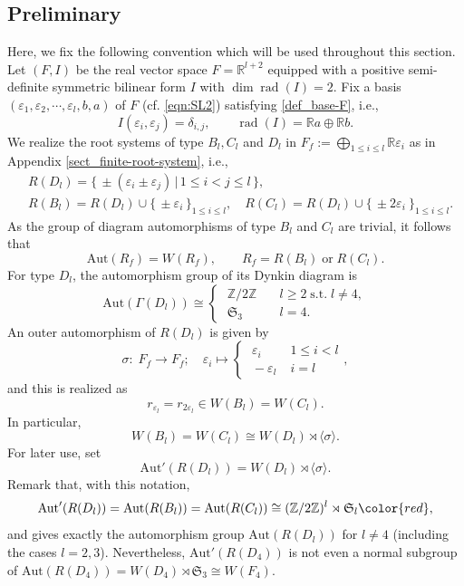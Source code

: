 \documentclass[11pt]{amsart}
\newcommand{\R}{\mathbb{R}}
\newcommand{\Z}{\mathbb{Z}}
\newcommand{\fS}{\mathfrak{S}}
\newcommand{\Aut}{\mathrm{Aut}}
\newcommand{\rad}{\operatorname{rad}}
\newcommand{\vep}{\varepsilon}
\begin{document}
\subsection{Preliminary}
Here, we fix the following convention which will be used throughout this section. \\
Let $(F,I)$ be the real vector space $F=\R^{l+2}$ equipped with a positive semi-definite symmetric bilinear form $I$ with $\dim \rad(I)=2$. Fix a basis $(\vep_1, \vep_2, \cdots, \vep_l, b,a)$ of $F$ (cf. \eqref{eqn:SL2}) satisfying \eqref{def_base-F}, i.e., 
\[ I(\vep_i, \vep_j)=\delta_{i,j}, \qquad \rad(I)=\R a\oplus  \R b. \]
We realize the root systems of type $B_l, C_l$ and $D_l$ in $F_f:=\bigoplus_{1\leq i\leq l} \R \vep_i$ as in Appendix \ref{sect_finite-root-system}, i.e., 
\begin{align*}
& R(D_l)=\{ \, \pm (\vep_i \pm \vep_j)\, \vert\, 1\leq i<j\leq l\, \}, \\
& R(B_l)=R(D_l) \cup \{ \, \pm \vep_i\,\}_{1\leq i\leq l}, \quad R(C_l)=R(D_l) \cup \{\, \pm 2\vep_i\ \}_{1\leq i\leq l}. 
\end{align*}
As the group of diagram automorphisms of type  $B_l$ and $C_l$ are trivial, it follows that
\[ \Aut(R_f)=W(R_f), \qquad R_f=R(B_l)\; \text{or} \; R(C_l). \]
For type $D_l$, the automorphism group of its Dynkin diagram is 
\[ \Aut(\Gamma(D_l)) \cong 
\begin{cases} \; \Z/2\Z \quad & l\geq 2\; \text{s.t.}\; l\neq 4, \\
                     \;\fS_3 \quad &l=4. \end{cases}
\]
An outer automorphism of $R(D_l)$ is given by
\[  \sigma: \; F_f \longrightarrow F_f; \quad \vep_i \mapsto  
                   \begin{cases} \; \vep_i \; & 1\leq i<l  \\ \;  -\vep_l \; & i=l \end{cases}, 
\]
and this is realized as
\[ r_{\vep_l}=r_{2\vep_l} \in W(B_l)=W(C_l). \]
In particular, 
\[ W(B_l)=W(C_l) \cong W(D_l) \rtimes \langle \sigma \rangle. \]
For later use, set
\[ \Aut'(R(D_l))=W(D_l) \rtimes \langle \sigma \rangle. \]
Remark that, with this notation,
\[ \Aut'(R(D_l))=\Aut(R(B_l))=\Aut(R(C_l)) \cong (\Z/2\Z)^l \rtimes \fS_l{\color{red},} \]
and gives exactly the automorphism group $\Aut(R(D_l))$ for $l\neq 4$ (including the cases $l=2,3$). Nevertheless,
$\Aut'(R(D_4))$ is not even a normal subgroup of $\Aut(R(D_4)) =W(D_4) \rtimes \fS_3 \cong W(F_4)$. 
\end{document}
